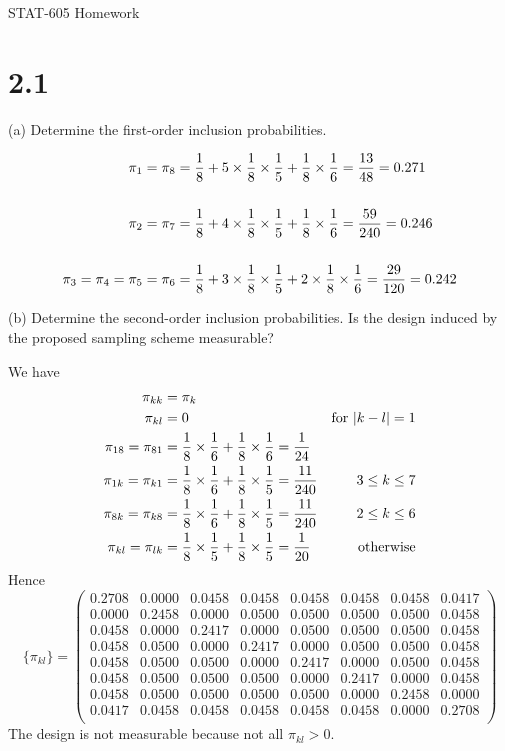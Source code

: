 \documentclass[12pt]{article}
\begin{document}
\begin{center}
STAT-605 Homework
\end{center}

\section*{2.1}
(a) Determine the first-order inclusion probabilities.

\begin{align*}
\pi_1=\pi_8&={1\over 8}+5\times{1\over8}\times{1\over5}+{1\over8}
\times{1\over6}={13\over48}=0.271\\
\\
\pi_2=\pi_7&={1\over8}+4\times{1\over8}\times{1\over5}+{1\over8}
\times{1\over6}={59\over240}=0.246\\
\\
\pi_3=\pi_4=\pi_5=\pi_6&={1\over8}+3\times{1\over8}\times{1\over5}
+2\times{1\over8}\times{1\over6}={29\over120}=0.242
\end{align*}

(b) Determine the second-order inclusion probabilities.
Is the design induced by the proposed sampling scheme measurable?

We have
\begin{align*}
\pi_{kk}&=\pi_k\\
\pi_{kl}&=0&\hbox{for $|k-l|=1$}\\
\pi_{18}=\pi_{81}&={1\over8}\times{1\over6}+{1\over8}\times{1\over6}={1\over24}\\
\pi_{1k}=\pi_{k1}&={1\over8}\times{1\over6}+{1\over8}\times
{1\over5}={11\over240}&3\le k\le7\\
\pi_{8k}=\pi_{k8}&={1\over8}\times{1\over6}+{1\over8}\times
{1\over5}={11\over240}&2\le k\le6\\
\pi_{kl}=\pi_{lk}&={1\over8}\times{1\over5}+{1\over8}\times{1\over5}={1\over20}&
\hbox{otherwise}
\end{align*}
Hence
\[
\{\pi_{kl}\}=
\left(
\begin{array}{cccccccc}
 0.2708 &  0.0000 &  0.0458 &  0.0458 &  0.0458 &  0.0458 &  0.0458 &  0.0417\\
 0.0000 &  0.2458 &  0.0000 &  0.0500 &  0.0500 &  0.0500 &  0.0500 &  0.0458\\
 0.0458 &  0.0000 &  0.2417 &  0.0000 &  0.0500 &  0.0500 &  0.0500 &  0.0458\\
 0.0458 &  0.0500 &  0.0000 &  0.2417 &  0.0000 &  0.0500 &  0.0500 &  0.0458\\
 0.0458 &  0.0500 &  0.0500 &  0.0000 &  0.2417 &  0.0000 &  0.0500 &  0.0458\\
 0.0458 &  0.0500 &  0.0500 &  0.0500 &  0.0000 &  0.2417 &  0.0000 &  0.0458\\
 0.0458 &  0.0500 &  0.0500 &  0.0500 &  0.0500 &  0.0000 &  0.2458 &  0.0000\\
 0.0417 &  0.0458 &  0.0458 &  0.0458 &  0.0458 &  0.0458 &  0.0000 &  0.2708\\
\end{array}\right)
\]
The design is not measurable because not all $\pi_{kl}>0$.
\end{document}
